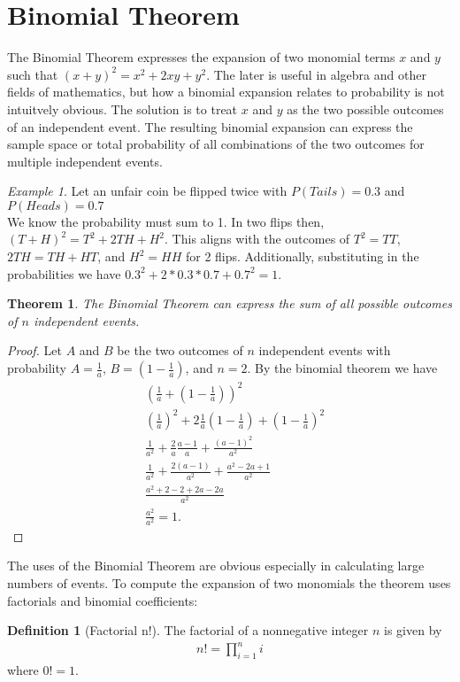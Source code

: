 \documentclass{article}
\theoremstyle{plain}
\newtheorem{theorem}{Theorem}
\theoremstyle{definition}
\newtheorem{definition}{Definition}
\theoremstyle{remark}
\newtheorem{example}{Example}
\begin{document}
\section{Binomial Theorem}
The Binomial Theorem expresses the expansion of two monomial terms $x$ and $y$ such that $(x + y)^2 = x^2 + 2xy + y^2$. The later is useful in algebra and other fields of mathematics, but how a binomial expansion relates to probability is not intuitvely obvious. The solution is to treat $x$ and $y$ as the two possible outcomes of an independent event. The resulting binomial expansion can express the sample space or total probability of all combinations of the two outcomes for multiple independent events.
\begin{example}
  Let an unfair coin be flipped twice with $P(Tails) = 0.3$ and $P(Heads) = 0.7$ \\
  We know the probability must sum to 1. In two flips then, $(T + H)^2 = T^2 + 2TH + H^2$. This aligns with the outcomes of $T^2 = TT$, $2TH = TH + HT$, and $H^2 = HH$ for 2 flips. Additionally, substituting in the probabilities we have $0.3^2 + 2*0.3*0.7 + 0.7^2 = 1$.
\end{example}
\begin{theorem}
  The Binomial Theorem can express the sum of all possible outcomes of $n$ independent events.
\end{theorem}
\begin{proof}
  Let $A$ and $B$ be the two outcomes of $n$ independent events with probability $A = \frac{1}{a}$, $B = (1 - \frac{1}{a})$, and $n = 2$. By the binomial theorem we have
  \begin{align*}
    &(\frac{1}{a} + (1-\frac{1}{a}))^2 \\
    &(\frac{1}{a})^2 + 2\frac{1}{a}(1-\frac{1}{a}) + (1-\frac{1}{a})^2 \\
    &\frac{1}{a^2} + \frac{2}{a}\frac{a-1}{a} + \frac{(a-1)^2}{a^2} \\
    &\frac{1}{a^2} + \frac{2(a-1)}{a^2} + \frac{a^2-2a+1}{a^2} \\
    &\frac{a^2+2-2+2a-2a}{a^2} \\
    &\frac{a^2}{a^2} = 1.
  \end{align*}
\end{proof}
The uses of the Binomial Theorem are obvious especially in calculating large numbers of events. To compute the expansion of two monomials the theorem uses factorials and binomial coefficients:
\begin{definition}[Factorial n!]
  The factorial of a nonnegative integer $n$ is given by
  \begin{align*}
    n! = {\displaystyle\prod_{i=1}^{n}i}
  \end{align*}
  where $0! = 1$.
\end{definition}
\end{document}
